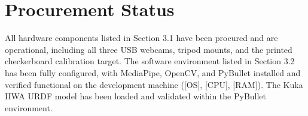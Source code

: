 \section{Procurement Status}
All hardware components listed in Section 3.1 have been procured and are operational, including all three USB webcams, tripod mounts, and the printed checkerboard calibration target. The software environment listed in Section 3.2 has been fully configured, with MediaPipe, OpenCV, and PyBullet installed and verified functional on the development machine ([OS], [CPU], [RAM]). The Kuka IIWA URDF model has been loaded and validated within the PyBullet environment.
